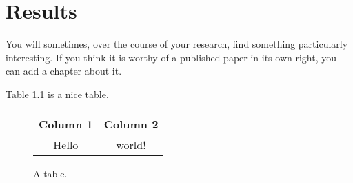 \chapter{Results}
You will sometimes, over the course of your research, find something
particularly interesting. If you think it is worthy of a published paper in
its own right, you can add a chapter about it.

\lipsum[25]

Table \ref{table:mytable} is a nice table.

\lipsum[30]

\begin{figure}
  \centering
  \begin{tabular}{cc}
    \toprule
    Column 1 & Column 2 \\
    \midrule
    Hello & world! \\
    \bottomrule
  \end{tabular}
  \caption{A table.}
  \label{table:mytable}
\end{figure}


\lipsum[20-25]